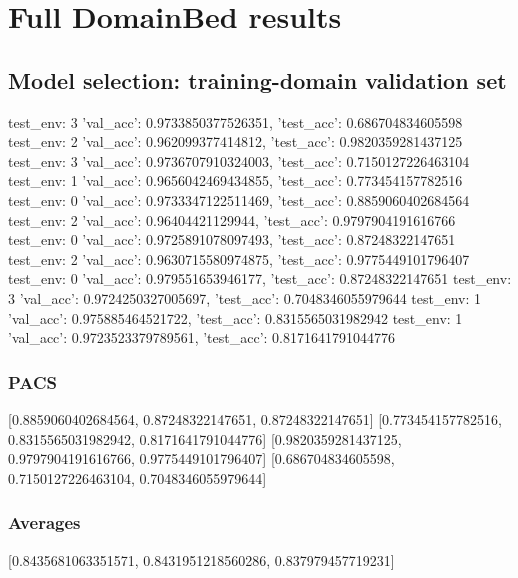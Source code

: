 \documentclass{article}
\begin{document}
\section{Full DomainBed results}

\subsection{Model selection: training-domain validation set}
test_env: 3
{'val_acc': 0.9733850377526351, 'test_acc': 0.686704834605598}
test_env: 2
{'val_acc': 0.962099377414812, 'test_acc': 0.9820359281437125}
test_env: 3
{'val_acc': 0.9736707910324003, 'test_acc': 0.7150127226463104}
test_env: 1
{'val_acc': 0.9656042469434855, 'test_acc': 0.773454157782516}
test_env: 0
{'val_acc': 0.9733347122511469, 'test_acc': 0.8859060402684564}
test_env: 2
{'val_acc': 0.96404421129944, 'test_acc': 0.9797904191616766}
test_env: 0
{'val_acc': 0.9725891078097493, 'test_acc': 0.87248322147651}
test_env: 2
{'val_acc': 0.9630715580974875, 'test_acc': 0.9775449101796407}
test_env: 0
{'val_acc': 0.979551653946177, 'test_acc': 0.87248322147651}
test_env: 3
{'val_acc': 0.9724250327005697, 'test_acc': 0.7048346055979644}
test_env: 1
{'val_acc': 0.975885464521722, 'test_acc': 0.8315565031982942}
test_env: 1
{'val_acc': 0.9723523379789561, 'test_acc': 0.8171641791044776}

\subsubsection{PACS}
[0.8859060402684564, 0.87248322147651, 0.87248322147651]
[0.773454157782516, 0.8315565031982942, 0.8171641791044776]
[0.9820359281437125, 0.9797904191616766, 0.9775449101796407]
[0.686704834605598, 0.7150127226463104, 0.7048346055979644]

\begin{center}
\end{center}

\subsubsection{Averages}
[0.8435681063351571, 0.8431951218560286, 0.837979457719231]

\begin{center}
\end{center}
\end{document}

